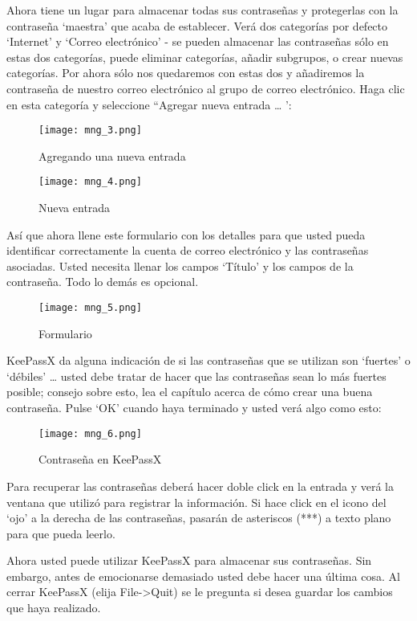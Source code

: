 \documentclass[10pt,a5paper,twoside,,]{book}
\begin{document}
Ahora tiene un lugar para almacenar todas sus contraseñas y protegerlas
con la contraseña `maestra' que acaba de establecer. Verá dos categorías
por defecto `Internet' y `Correo electrónico' - se pueden almacenar las
contraseñas sólo en estas dos categorías, puede eliminar categorías,
añadir subgrupos, o crear nuevas categorías. Por ahora sólo nos
quedaremos con estas dos y añadiremos la contraseña de nuestro correo
electrónico al grupo de correo electrónico. Haga clic en esta categoría
y seleccione ``Agregar nueva entrada \ldots{} ':

\begin{figure}[htbp]
\centering
\texttt{[image: mng\_3.png]}
\caption{Agregando una nueva entrada}
\end{figure}

\begin{figure}[htbp]
\centering
\texttt{[image: mng\_4.png]}
\caption{Nueva entrada}
\end{figure}

Así que ahora llene este formulario con los detalles para que usted
pueda identificar correctamente la cuenta de correo electrónico y las
contraseñas asociadas. Usted necesita llenar los campos `Título' y los
campos de la contraseña. Todo lo demás es opcional.

\begin{figure}[htbp]
\centering
\texttt{[image: mng\_5.png]}
\caption{Formulario}
\end{figure}

KeePassX da alguna indicación de si las contraseñas que se utilizan son
`fuertes' o `débiles' \ldots{} usted debe tratar de hacer que las
contraseñas sean lo más fuertes posible; consejo sobre esto, lea el
capítulo acerca de cómo crear una buena contraseña. Pulse `OK' cuando
haya terminado y usted verá algo como esto:

\begin{figure}[htbp]
\centering
\texttt{[image: mng\_6.png]}
\caption{Contraseña en KeePassX}
\end{figure}

Para recuperar las contraseñas deberá hacer doble click en la entrada y
verá la ventana que utilizó para registrar la información. Si hace click
en el icono del `ojo' a la derecha de las contraseñas, pasarán de
asteriscos (***) a texto plano para que pueda leerlo.

Ahora usted puede utilizar KeePassX para almacenar sus contraseñas. Sin
embargo, antes de emocionarse demasiado usted debe hacer una última
cosa. Al cerrar KeePassX (elija File-\textgreater{}Quit) se le pregunta
si desea guardar los cambios que haya realizado.
\end{document}
